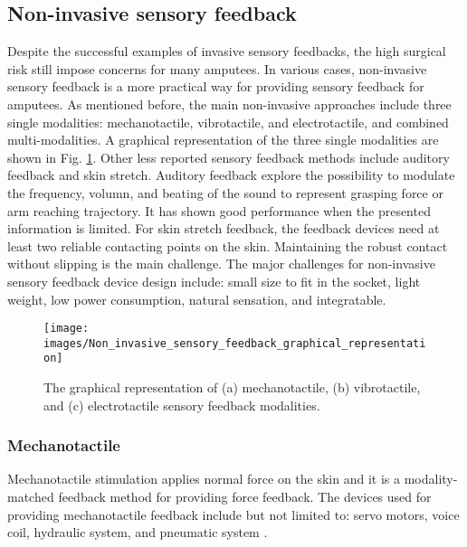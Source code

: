 \subsection{Non-invasive sensory feedback}
Despite the successful examples of invasive sensory feedbacks, the high surgical risk still impose concerns for many amputees. In various cases, non-invasive sensory feedback is a more practical way for providing sensory feedback for amputees. As mentioned before, the main non-invasive approaches include three single modalities: mechanotactile, vibrotactile, and electrotactile, and combined multi-modalities.  A graphical representation of the three single modalities are shown in Fig. \ref{fig:graphical_representation_single_modalities}. 
Other less reported sensory feedback methods include auditory feedback \cite{gonzalez2012psycho, wilson2016audio, lundborg1999hearing,gonzalez2010multichannel} and skin stretch.
Auditory feedback explore the possibility to modulate the frequency, volumn, and beating of the sound to represent grasping force or arm reaching trajectory. It has shown good performance when the presented information is limited.
For skin stretch feedback, the feedback devices need at least two reliable contacting points on the skin. Maintaining the robust contact without slipping is the main challenge. The major challenges for non-invasive sensory feedback device design include: small size to fit in the socket, light weight, low power consumption, natural sensation, and integratable. 
 
 \begin{figure}[htb]
    \centering
       \texttt{[image: images/Non\_invasive\_sensory\_feedback\_graphical\_representation]}
        \caption{The graphical representation of (a) mechanotactile, (b) vibrotactile, and (c) electrotactile sensory feedback modalities.}
        \label{fig:graphical_representation_single_modalities}
\end{figure}

\subsubsection{Mechanotactile}
Mechanotactile stimulation applies normal force on the skin and it is a modality-matched feedback method for providing force feedback.
The devices used for providing mechanotactile feedback include but not limited to: servo motors, voice coil, hydraulic system, and pneumatic system \cite{childress1980closed, antfolk2013sensory, schofield2014applications, svensson2017review}.


